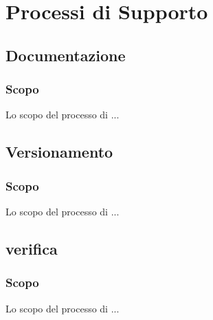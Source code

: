 \section{Processi di Supporto}
\subsection{Documentazione}
\subsubsection{Scopo}
Lo scopo del processo di ...

\subsection{Versionamento}
\subsubsection{Scopo}
Lo scopo del processo di ...

\subsection{verifica}
\subsubsection{Scopo}
Lo scopo del processo di ...